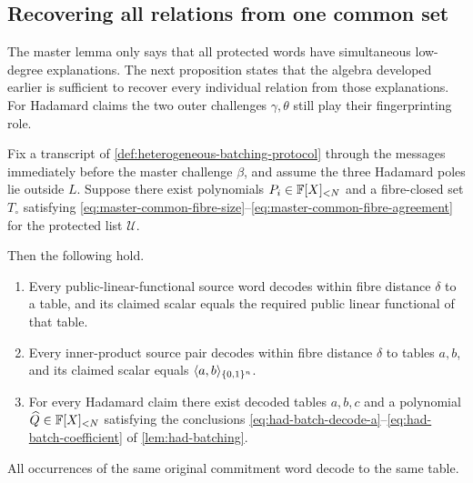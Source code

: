 \subsection{Recovering all relations from one common set}
\label{sec:recover-all-relations}

The master lemma only says that all protected words have simultaneous low-degree explanations.  The next proposition states that the algebra developed earlier is sufficient to recover every individual relation from those explanations.  For Hadamard claims the two outer challenges $\gamma,\theta$ still play their fingerprinting role.

\begin{proposition}
\label{prop:heterogeneous-deterministic-recovery}
Fix a transcript of \cref{def:heterogeneous-batching-protocol} through the messages immediately before the master challenge $\beta$, and assume the three Hadamard poles lie outside $L$.  Suppose there exist polynomials $P_i\in\mathbb{F}[X]_{<N}$ and a fibre-closed set $T_\circ$ satisfying \eqref{eq:master-common-fibre-size}--\eqref{eq:master-common-fibre-agreement} for the protected list $\mathcal U$.

Then the following hold.
\begin{enumerate}[label=(\roman*),leftmargin=*]
  \item Every public-linear-functional source word decodes within fibre distance $\delta$ to a table, and its claimed scalar equals the required public linear functional of that table.

  \item Every inner-product source pair decodes within fibre distance $\delta$ to tables $a,b$, and its claimed scalar equals $\langle a,b\rangle_{\{0,1\}^n}$.

  \item For every Hadamard claim there exist decoded tables $a,b,c$ and a polynomial $\widehat Q\in\mathbb{F}[X]_{<N}$ satisfying the conclusions \eqref{eq:had-batch-decode-a}--\eqref{eq:had-batch-coefficient} of \cref{lem:had-batching}.
\end{enumerate}
All occurrences of the same original commitment word decode to the same table.
\end{proposition}


